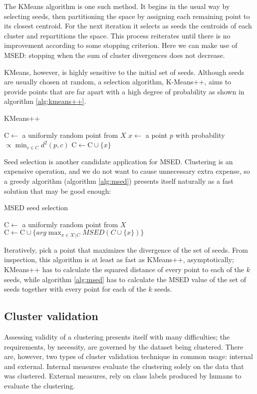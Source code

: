 The KMeans algorithm is one such method.  It begins in the usual way by selecting seeds, then partitioning the space by assigning each remaining point to its closest centroid.  For the next iteration it selects as seeds the centroids of each cluster and repartitions the space.  This process reiterates until there is no improvement according to some stopping criterion.  Here we can make use of MSED: stopping when the sum of cluster divergences does not decrease.

KMeans, however, is highly sensitive to the initial set of seeds\cite{Arthur:2007}.  Although seeds are usually chosen at random, a selection algorithm, K-Means++, aims to provide points that are far apart with a high degree of probability as shown in algorithm \ref{alg:kmeans++}.
\begin{algorithm}
\caption{KMeans++}
\label{alg:kmeans++}
\begin{algorithmic}
\State $\mathrm{C} \gets $ a uniformly random point from $X$
	\State $x \gets$ a point $p$ with probability $\propto \min_{c \in C} d^2(p, c)$
	\State $\mathrm{C} \gets \mathrm{C} \cup \{x\}$
\EndWhile
\end{algorithmic}
\end{algorithm}

Seed selection is another candidate application for MSED.  Clustering is an expensive operation, and we do not want to cause unnecessary extra expense, so a greedy algorithm (algorithm \ref{alg:msed}) presents itself naturally as a fast solution that may be good enough:
\begin{algorithm}
\caption{MSED seed selection}
\label{alg:msed}
\begin{algorithmic}
\State $\mathrm{C} \gets $ a uniformly random point from $X$
	\State $\mathrm{C} \gets \mathrm{C} \cup \{ arg \max_{x \in X \setminus C} MSED(C \cup \{x\}) \}$
\EndWhile
\end{algorithmic}
\end{algorithm}
Iteratively, pick a point that maximizes the divergence of the set of seeds.  From inspection, this algorithm is at least as fast as KMeans++, asymptotically; KMeans++ has to calculate the squared distance of every point to each of the $k$ seeds, while algorithm \ref{alg:msed} has to calculate the MSED value of the set of seeds together with every point for each of the $k$ seeds.
\subsection{Cluster validation}
Assessing validity of a clustering presents itself with many difficulties; the requirements, by necessity, are governed by the dataset being clustered. There are, however, two types of cluster validation technique in common usage: internal and external.  Internal measures evaluate the clustering solely on the data that was clustered.  External measures, rely on class labels produced by humans to evaluate the clustering.  

